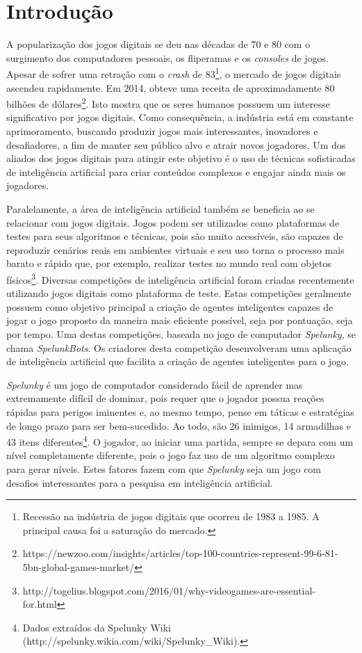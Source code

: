 \chapter{\label{chap:introduction}Introdução}
A popularização dos jogos digitais se deu nas décadas de 70 e 80 com o
surgimento dos computadores pessoais, os fliperamas e os \textit{consoles} de
jogos. Apesar de sofrer uma retração com o \textit{crash} de
83\footnote{Recessão na indústria de jogos digitais que ocorreu de 1983 a 1985.
A principal causa foi a saturação do mercado.}, o mercado de jogos digitais
ascendeu rapidamente. Em 2014, obteve uma receita de aproximadamente 80 bilhões
de
dólares\footnote{https://newzoo.com/insights/articles/top-100-countries-represent-99-6-81-5bn-global-games-market/}.
Isto mostra que os seres humanos possuem um interesse significativo por jogos
digitais. Como consequência, a indústria está em constante aprimoramento,
buscando produzir jogos mais interessantes, inovadores e desafiadores, a fim de
manter seu público alvo e atrair novos jogadores. Um dos aliados dos jogos
digitais para atingir este objetivo é o uso de técnicas sofisticadas de
inteligência artificial para criar conteúdos complexos e engajar ainda mais
os jogadores\cite{PanoramaAIGames}.

Paralelamente, a área de inteligência artificial também se beneficia ao se
relacionar com jogos digitais. Jogos podem ser utilizados como plataformas de
testes para seus algoritmos e técnicas, pois são muito acessíveis, são capazes
de reproduzir cenários reais em ambientes virtuais e seu uso torna o processo
mais barato e rápido que, por exemplo, realizar testes no mundo real com objetos
físicos\footnote{http://togelius.blogspot.com/2016/01/why-videogames-are-essential-for.html}.
Diversas competições de inteligência artificial foram criadas recentemente
utilizando jogos digitais como plataforma de teste\cite{GameAiCompetition}.
Estas competições geralmente possuem como objetivo principal a criação de
agentes inteligentes capazes de jogar o jogo proposto da maneira mais eficiente
possível, seja por pontuação, seja por tempo. Uma destas competições, baseada no
jogo de computador \textit{Spelunky}, se chama \textit{SpelunkBots}. Os
criadores desta competição desenvolveram uma aplicação de inteligência
artificial que facilita a criação de agentes inteligentes para o jogo.

\textit{Spelunky} é um jogo de computador considerado fácil de aprender mas
extremamente difícil de dominar, pois requer que o jogador possua reações
rápidas para perigos iminentes e, ao mesmo tempo, pense em táticas e estratégias
de longo prazo para ser bem-sucedido. Ao todo, são 26 inimigos, 14 armadilhas e
43 itens diferentes\footnote{Dados extraídos da Spelunky Wiki
(http://spelunky.wikia.com/wiki/Spelunky\_Wiki).}. O jogador, ao iniciar uma
partida, sempre se depara com um nível completamente diferente, pois o jogo faz
uso de um algoritmo complexo para gerar níveis. Estes fatores fazem com que
\textit{Spelunky} seja um jogo com desafios interessantes para a pesquisa em
inteligência artificial.

